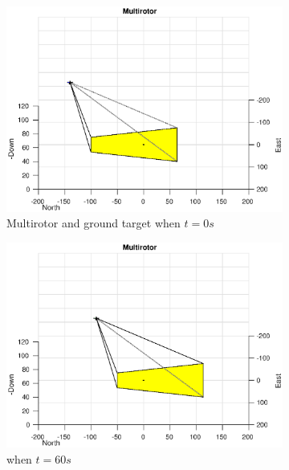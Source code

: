 \begin{figure}[htbp]
	\centering
	\begin{subfigure}[t]{0.45\linewidth}
		\includegraphics[width=\textwidth]{images/chapter4/image_UAV_0mps}
		\caption{Multirotor and ground target when $t=0s$}
	\end{subfigure}
	\begin{subfigure}[t]{0.45\linewidth}
		\includegraphics[width=\textwidth]{images/chapter4/image_UAV_0mps_60s}
		\caption{when $t=60s$}
	\end{subfigure}
	\begin{subfigure}[t]{0.45\linewidth}

\end{subfigure}
\end{figure}
